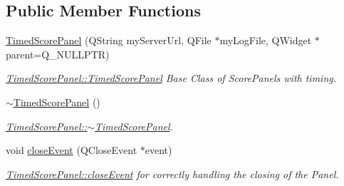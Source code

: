 \subsection*{Public Member Functions}
\begin{DoxyCompactItemize}
\item 
\mbox{\hyperlink{classTimedScorePanel_ac8b702def5462d859d6aa9d430d3aa86}{Timed\+Score\+Panel}} (Q\+String my\+Server\+Url, Q\+File $\ast$my\+Log\+File, Q\+Widget $\ast$parent=Q\+\_\+\+N\+U\+L\+L\+P\+TR)
\begin{DoxyCompactList}\small\item\em \mbox{\hyperlink{classTimedScorePanel_ac8b702def5462d859d6aa9d430d3aa86}{Timed\+Score\+Panel\+::\+Timed\+Score\+Panel}} Base Class of Score\+Panels with timing. \end{DoxyCompactList}\item 
\mbox{\label{classTimedScorePanel_a5041ef1a718767bfe06af940ce38843f}} 
\mbox{\hyperlink{classTimedScorePanel_a5041ef1a718767bfe06af940ce38843f}{$\sim$\+Timed\+Score\+Panel}} ()
\begin{DoxyCompactList}\small\item\em \mbox{\hyperlink{classTimedScorePanel_a5041ef1a718767bfe06af940ce38843f}{Timed\+Score\+Panel\+::$\sim$\+Timed\+Score\+Panel}}. \end{DoxyCompactList}\item 
void \mbox{\hyperlink{classTimedScorePanel_a04915c8a5ff6d471bc855d57fc7ac23b}{close\+Event}} (Q\+Close\+Event $\ast$event)
\begin{DoxyCompactList}\small\item\em \mbox{\hyperlink{classTimedScorePanel_a04915c8a5ff6d471bc855d57fc7ac23b}{Timed\+Score\+Panel\+::close\+Event}} for correctly handling the closing of the Panel. \end{DoxyCompactList}\end{DoxyCompactItemize}
